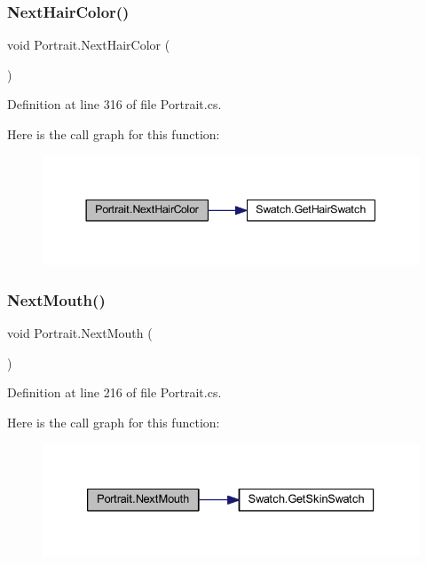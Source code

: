 \subsubsection{\texorpdfstring{NextHairColor()}{NextHairColor()}}
{\footnotesize\ttfamily void Portrait.\+Next\+Hair\+Color (\begin{DoxyParamCaption}{ }\end{DoxyParamCaption})}



Definition at line 316 of file Portrait.\+cs.

Here is the call graph for this function\+:
\nopagebreak
\begin{figure}[H]
\begin{center}
\leavevmode
\includegraphics[width=344pt]{class_portrait_a8117eeefced674e0a4a483745ea0053d_cgraph}
\end{center}
\end{figure}
\mbox{\label{class_portrait_ae5ff256c7c14879853d221dfd9df2d63}} 
\subsubsection{\texorpdfstring{NextMouth()}{NextMouth()}}
{\footnotesize\ttfamily void Portrait.\+Next\+Mouth (\begin{DoxyParamCaption}{ }\end{DoxyParamCaption})}



Definition at line 216 of file Portrait.\+cs.

Here is the call graph for this function\+:
\nopagebreak
\begin{figure}[H]
\begin{center}
\leavevmode
\includegraphics[width=333pt]{class_portrait_ae5ff256c7c14879853d221dfd9df2d63_cgraph}
\end{center}
\end{figure}
\mbox{\label{class_portrait_a7fc2c7d9f078303182503c717c05b9d5}} 
